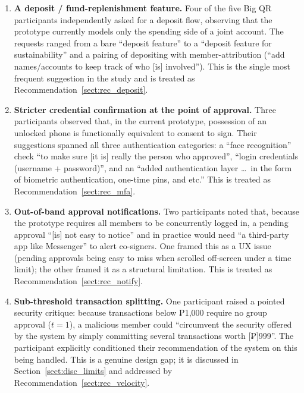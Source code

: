 \begin{enumerate}
  \item \textbf{A deposit / fund-replenishment feature.} Four of the five Big QR participants independently asked for a deposit flow, observing that the prototype currently models only the spending side of a joint account. The requests ranged from a bare ``deposit feature'' to a ``deposit feature for sustainability'' and a pairing of depositing with member-attribution (``add names/accounts to keep track of who [is] involved''). This is the single most frequent suggestion in the study and is treated as Recommendation~\ref{sect:rec_deposit}.
  \item \textbf{Stricter credential confirmation at the point of approval.} Three participants observed that, in the current prototype, possession of an unlocked phone is functionally equivalent to consent to sign. Their suggestions spanned all three authentication categories: a ``face recognition'' check ``to make sure [it is] really the person who approved'', ``login credentials (username + password)'', and an ``added authentication layer \dots\ in the form of biometric authentication, one-time pins, and etc.'' This is treated as Recommendation~\ref{sect:rec_mfa}.
  \item \textbf{Out-of-band approval notifications.} Two participants noted that, because the prototype requires all members to be concurrently logged in, a pending approval ``[is] not easy to notice'' and in practice would need ``a third-party app like Messenger'' to alert co-signers. One framed this as a UX issue (pending approvals being easy to miss when scrolled off-screen under a time limit); the other framed it as a structural limitation. This is treated as Recommendation~\ref{sect:rec_notify}.
  \item \textbf{Sub-threshold transaction splitting.} One participant raised a pointed security critique: because transactions below ₱1{,}000 require no group approval ($t = 1$), a malicious member could ``circumvent the security offered by the system by simply committing several transactions worth [₱]999''. The participant explicitly conditioned their recommendation of the system on this being handled. This is a genuine design gap; it is discussed in Section~\ref{sect:disc_limits} and addressed by Recommendation~\ref{sect:rec_velocity}.
\end{enumerate}


